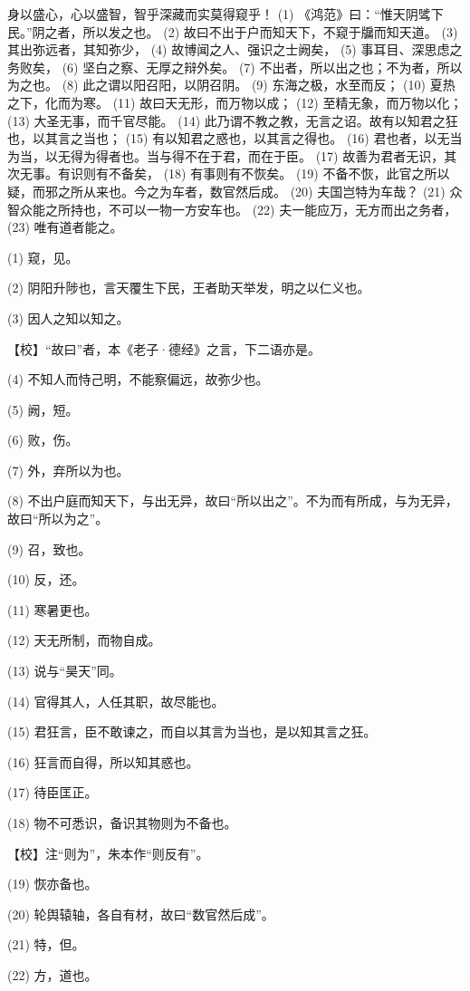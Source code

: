 \documentclass[12pt,UTF8]{ctexbook}
\begin{document}
身以盛心，心以盛智，智乎深藏而实莫得窥乎！ (1) 《鸿范》曰：“惟天阴骘下民。”阴之者，所以发之也。 (2) 故曰不出于户而知天下，不窥于牖而知天道。 (3) 其出弥远者，其知弥少， (4) 故博闻之人、强识之士阙矣， (5) 事耳目、深思虑之务败矣， (6) 坚白之察、无厚之辩外矣。 (7) 不出者，所以出之也；不为者，所以为之也。 (8) 此之谓以阳召阳，以阴召阴。 (9) 东海之极，水至而反； (10) 夏热之下，化而为寒。 (11) 故曰天无形，而万物以成； (12) 至精无象，而万物以化； (13) 大圣无事，而千官尽能。 (14) 此乃谓不教之教，无言之诏。故有以知君之狂也，以其言之当也； (15) 有以知君之惑也，以其言之得也。 (16) 君也者，以无当为当，以无得为得者也。当与得不在于君，而在于臣。 (17) 故善为君者无识，其次无事。有识则有不备矣， (18) 有事则有不恢矣。 (19) 不备不恢，此官之所以疑，而邪之所从来也。今之为车者，数官然后成。 (20) 夫国岂特为车哉？ (21) 众智众能之所持也，不可以一物一方安车也。 (22) 夫一能应万，无方而出之务者， (23) 唯有道者能之。

(1) 窥，见。

(2) 阴阳升陟也，言天覆生下民，王者助天举发，明之以仁义也。

(3) 因人之知以知之。

【校】“故曰”者，本《老子·德经》之言，下二语亦是。

(4) 不知人而恃己明，不能察偏远，故弥少也。

(5) 阙，短。

(6) 败，伤。

(7) 外，弃所以为也。

(8) 不出户庭而知天下，与出无异，故曰“所以出之”。不为而有所成，与为无异，故曰“所以为之”。

(9) 召，致也。

(10) 反，还。

(11) 寒暑更也。

(12) 天无所制，而物自成。

(13) 说与“昊天”同。

(14) 官得其人，人任其职，故尽能也。

(15) 君狂言，臣不敢谏之，而自以其言为当也，是以知其言之狂。

(16) 狂言而自得，所以知其惑也。

(17) 待臣匡正。

(18) 物不可悉识，备识其物则为不备也。

【校】注“则为”，朱本作“则反有”。

(19) 恢亦备也。

(20) 轮舆辕轴，各自有材，故曰“数官然后成”。

(21) 特，但。

(22) 方，道也。
\end{document}
